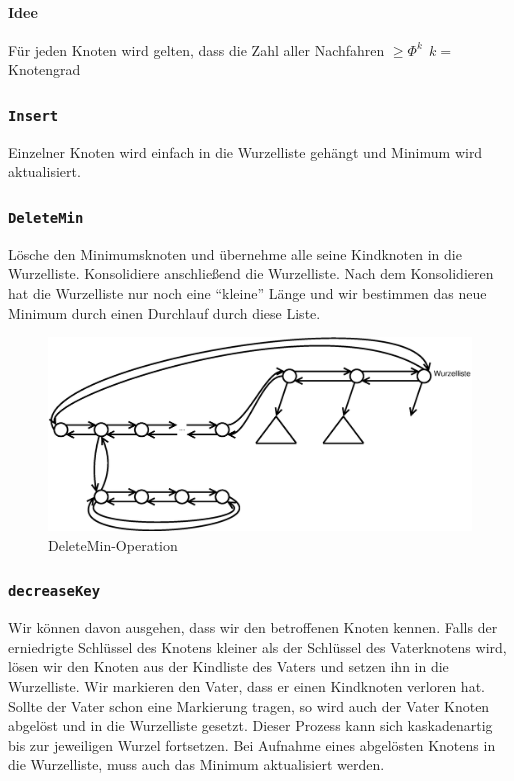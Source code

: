 \paragraph{Idee}
Für jeden Knoten wird gelten, dass die Zahl aller Nachfahren $\geq \Phi^k~~k=$Knotengrad

\subsubsection{\texttt{Insert}}
Einzelner Knoten wird einfach in die Wurzelliste gehängt und Minimum wird aktualisiert.

\subsubsection{\texttt{DeleteMin}}
Lösche den Minimumsknoten und übernehme alle seine Kindknoten in die Wurzelliste. Konsolidiere anschließend die Wurzelliste. Nach dem Konsolidieren hat die Wurzelliste nur noch eine "`kleine"' Länge und wir bestimmen das neue Minimum durch einen Durchlauf durch diese Liste.
\begin{figure}[H]
	\centering
	\includegraphics[width=0.65\linewidth]{21/Grafik/deleteMin}
	\caption{DeleteMin-Operation}
\end{figure}

\subsubsection{\texttt{decreaseKey}}
Wir können davon ausgehen, dass wir den betroffenen Knoten kennen. Falls der erniedrigte Schlüssel des Knotens kleiner als der Schlüssel des Vaterknotens wird, lösen wir den Knoten aus der Kindliste des Vaters und setzen ihn in die Wurzelliste. Wir markieren den Vater, dass er einen Kindknoten verloren hat. Sollte der Vater schon eine Markierung tragen, so wird auch der Vater Knoten abgelöst und in die Wurzelliste gesetzt. Dieser Prozess kann sich kaskadenartig bis zur jeweiligen Wurzel fortsetzen. Bei Aufnahme eines abgelösten Knotens in die Wurzelliste, muss auch das Minimum aktualisiert werden.

